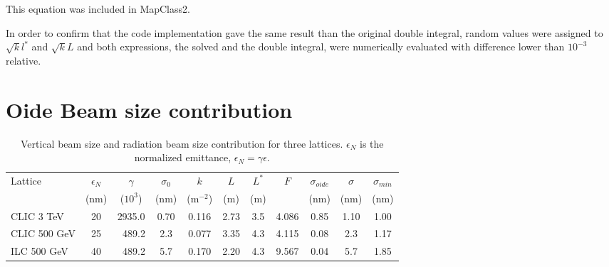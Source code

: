 This equation was included in MapClass2\cite{Mapclassorig,Mapclass,Mapclass2,githubMapClass2}.\par In order to confirm that the code implementation gave the same result than the original double integral, random values were assigned to $\sqrt{k}l^*$ and $\sqrt{k}L$ and both expressions, the solved and the double integral, were numerically evaluated with difference lower than $10^{-3}$ relative.\par

\section{Oide Beam size contribution}
\begin{table}[!hbt]
\centering
\begin{tabular}{l||c|c|c||c|c|c|c|c||c|c}\hline\hline
Lattice &$\epsilon_N$& $\gamma$& $\sigma_0$&$k$&$L$&$L^*$& $F$ & $\sigma_{oide}$&$\sigma$&$\sigma_{min}$\\
 &(nm)&($10^3$)&(nm)&(m$^{-2}$)&(m)&(m)&&(nm) &(nm)&(nm)\\\hline
CLIC 3 TeV & 20 & 2935.0 & 0.70 & 0.116 & 2.73 &3.5&  4.086  & 0.85 & 1.10& 1.00 \\
CLIC 500 GeV & 25 & $\;\;$489.2 & 2.3 & 0.077 & 3.35 &4.3& 4.115 & 0.08 & 2.3 & 1.17\\
ILC  500 GeV & 40 & $\;\;$489.2 & 5.7 & 0.170 & 2.20 &4.3& 9.567 & 0.04 & 5.7 & 1.85\\\hline
\end{tabular}\caption{Vertical beam size and radiation beam size contribution for three lattices. $\epsilon_N$ is the normalized emittance, $\epsilon_N=\gamma\epsilon$.}\label{t:Sigmas}
\end{table}
